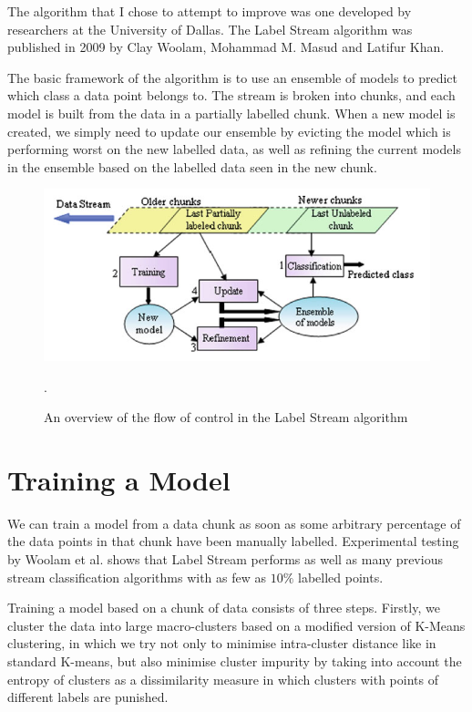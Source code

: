 \documentclass[12pt,a4paper,oneside]{report}
\begin{document}
The algorithm that I chose to attempt to improve was one developed by researchers at the University of Dallas. The Label Stream algorithm was published in 2009 by Clay Woolam, Mohammad M. Masud and Latifur Khan\cite{LabStr}.

The basic framework of the algorithm is to use an ensemble of models to predict which class a data point belongs to. The stream is broken into chunks, and each model is built from the data in a partially labelled chunk.  When a new model is created, we simply need to update our ensemble by evicting the model which is performing worst on the new labelled data, as well as refining the current models in the ensemble based on the labelled data seen in the new chunk. 
\begin{figure}
	\includegraphics[scale = 0.4]{LabStrOverview}
	\caption{An overview of the flow of control in the Label Stream algorithm \cite{TechRep}}.
\end{figure}

\section{Training a Model}

We can train a model from a data chunk as soon as some arbitrary percentage of the data points in that chunk have been manually labelled. Experimental testing by Woolam et al. shows that Label Stream performs as well as many previous stream classification algorithms with as few as \(10\%\) labelled points\cite{LabStr}.

Training a model based on a chunk of data consists of three steps. Firstly, we cluster the data into large macro-clusters based on a modified version of K-Means clustering, in which we try not only to minimise intra-cluster distance like in standard K-means, but also minimise cluster impurity by taking into account the entropy of clusters as a dissimilarity measure in which clusters with points of different labels are punished. 
\end{document}
